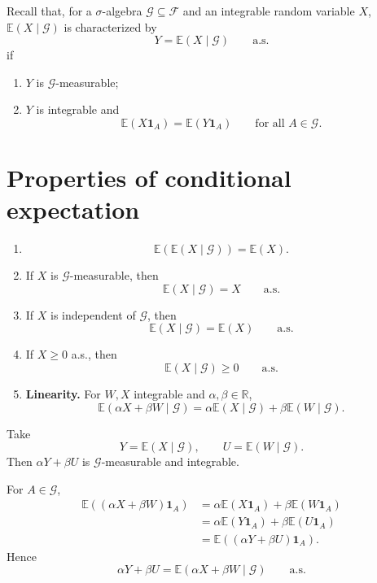 \documentclass[11pt,a4paper]{article}
\begin{document}
\medskip

Recall that, for a $\sigma$-algebra $\mathcal{G}\subseteq\mathcal{F}$ and an integrable random variable $X$,
$\mathbb{E}(X\mid\mathcal{G})$ is characterized by
\[
Y=\mathbb{E}(X\mid\mathcal{G})
\qquad\text{a.s.}
\]
if
\begin{enumerate}
    \item[(a)] $Y$ is $\mathcal{G}$-measurable;

    \item[(b)] $Y$ is integrable and
    \[
    \mathbb{E}(X\mathbf{1}_A)
    =
    \mathbb{E}(Y\mathbf{1}_A)
    \qquad\text{for all }A\in\mathcal{G}.
    \]
\end{enumerate}

\section*{Properties of conditional expectation}

\begin{enumerate}
    \item[(i)]
    \[
    \mathbb{E}\!\left(\mathbb{E}(X\mid\mathcal{G})\right)
    =
    \mathbb{E}(X).
    \]

    \item[(ii)]
    If $X$ is $\mathcal{G}$-measurable, then
    \[
    \mathbb{E}(X\mid\mathcal{G})=X
    \qquad\text{a.s.}
    \]

    \item[(iii)]
    If $X$ is independent of $\mathcal{G}$, then
    \[
    \mathbb{E}(X\mid\mathcal{G})=\mathbb{E}(X)
    \qquad\text{a.s.}
    \]

    \item[(iv)]
    If $X\geq 0$ a.s., then
    \[
    \mathbb{E}(X\mid\mathcal{G})\geq 0
    \qquad\text{a.s.}
    \]

    \item[(v)]
    \textbf{Linearity.}
    For $W,X$ integrable and $\alpha,\beta\in\mathbb{R}$,
    \[
    \mathbb{E}(\alpha X+\beta W\mid\mathcal{G})
    =
    \alpha\mathbb{E}(X\mid\mathcal{G})
    +
    \beta\mathbb{E}(W\mid\mathcal{G}).
    \]
\end{enumerate}

Take
\[
Y=\mathbb{E}(X\mid\mathcal{G}),
\qquad
U=\mathbb{E}(W\mid\mathcal{G}).
\]
Then $\alpha Y+\beta U$ is $\mathcal{G}$-measurable and integrable.

For $A\in\mathcal{G}$,
\[
\begin{aligned}
\mathbb{E}\!\left((\alpha X+\beta W)\mathbf{1}_A\right)
&=\alpha\mathbb{E}(X\mathbf{1}_A)
  +\beta\mathbb{E}(W\mathbf{1}_A)\\
&=\alpha\mathbb{E}(Y\mathbf{1}_A)
  +\beta\mathbb{E}(U\mathbf{1}_A)\\
&=\mathbb{E}\!\left((\alpha Y+\beta U)\mathbf{1}_A\right).
\end{aligned}
\]
Hence
\[
\alpha Y+\beta U
=
\mathbb{E}(\alpha X+\beta W\mid\mathcal{G})
\qquad\text{a.s.}
\]
\end{document}
